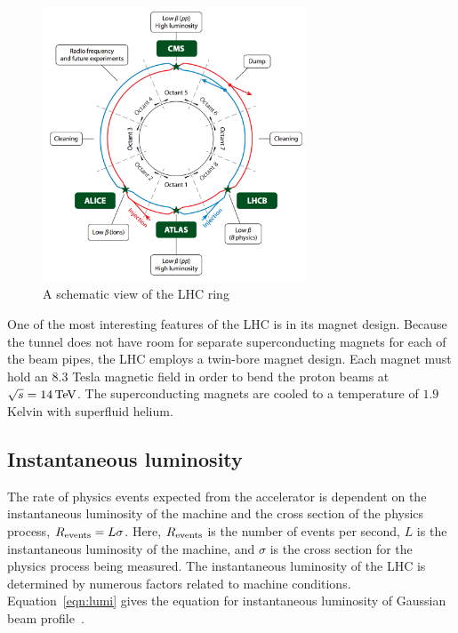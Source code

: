 \begin{figure}[h!]
  \centering
  \captionsetup{justification=centering}

  \includegraphics[width=0.7\textwidth]{figures/LHC}
   \caption{A schematic view of the LHC ring ~\cite{LHCReview}}
  \label{fig:LHC}
\end{figure}

One of the most interesting features of the LHC is in its magnet design. Because the tunnel does not have room for separate superconducting magnets for each of the beam pipes, the LHC employs a twin-bore magnet design. Each magnet must hold an $8.3$ Tesla magnetic field in order to bend the proton beams at $\sqrt{s} = 14 \TeV$. The superconducting magnets are cooled to a temperature of $1.9$ Kelvin with superfluid helium.  

\subsection{Instantaneous luminosity}

The rate of physics events expected from the accelerator is dependent on the instantaneous luminosity of the machine and the cross section of the physics process, $R_{\rm events} = L\sigma$. Here, $R_{\rm events}$ is the number of events per second, $L$ is the instantaneous luminosity of the machine, and $\sigma$ is the cross section for the physics process being measured. The instantaneous luminosity of the LHC is determined by numerous factors related to machine conditions. Equation~\ref{eqn:lumi} gives the equation for instantaneous luminosity of Gaussian beam profile~\cite{LHCReview}.

